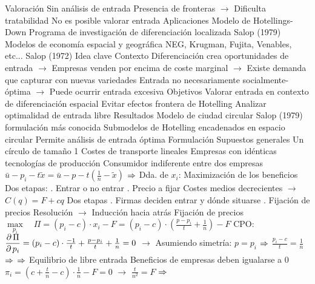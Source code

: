 \documentclass{nuevotema}
\begin{document}
\begin{esquemal}
			\3 Valoración
				\4 Sin análisis de entrada
				\4[] Presencia de fronteras
				\4[] $\to$ Dificulta tratabilidad
				\4 No es posible valorar entrada
			\3 Aplicaciones
				\4 Modelo de Hotellings-Down
				\4 Programa de investigación de diferenciación localizada
				\4[] Salop (1979)
				\4 Modelos de economía espacial y geográfica
				\4[] NEG, Krugman, Fujita, Venables, etc...
		\2 Salop (1972)
			\3 Idea clave
				\4 Contexto
				\4[] Diferenciación crea oportunidades de entrada
				\4[] $\to$ Empresas venden por encima de coste marginal
				\4[] $\to$ Existe demanda que capturar con nuevas variedades
				\4[] Entrada no necesariamente socialmente-óptima
				\4[] $\to$ Puede ocurrir entrada excesiva
				\4 Objetivos
				\4[] Valorar entrada en contexto de diferenciación espacial
				\4[] Evitar efectos frontera de Hotelling
				\4[] Analizar optimalidad de entrada libre
				\4 Resultados
				\4[] Modelo de ciudad circular
				\4[] Salop (1979) formulación más conocida
				\4[] Submodelos de Hotelling encadenados en espacio circular
				\4[] Permite análisis de entrada óptima
			\3 Formulación
				\4 Supuestos generales
				\4[] Un círculo de tamaño 1
				\4[] Costes de transporte lineales
				\4[] Empresas con idénticas tecnologías de producción
				\4 Consumidor indiferente entre dos empresas
				\4[] $\bar{u} - p_i - t \tilde{x} = \bar{u} - p - t(\frac{1}{n} - \tilde{x})$
				\4[] $\Rightarrow$ Dda. de $x_i$: 
				\4 Maximización de los beneficios
				\4[] Dos etapas:
				. Entrar o no entrar
				. Precio a fijar
				\4[] Costes medios decrecientes
				\4[] $\to$ $C(q) = F + cq$
				\4[] Dos etapas
				. Firmas deciden entrar y dónde situarse
				. Fijación de precios
				\4[] Resolución
				\4[] $\to$ Inducción hacia atrás
				\4 Fijación de precios
				\4[] $\underset{p_i}{\max}\quad \Pi=\left(p_i -c \right) \cdot x_i - F = \left( p_i -c \right) \cdot \left( \frac{p - p_i}{t} + \frac{1}{n} \right) - F$
				\4[] CPO: \quad $\dfrac{\partial \, \Pi}{\partial \, p_i} = \left(p_i -c \right) \cdot \frac{-1}{t} + \frac{p - p_i}{t} + \frac{1}{n} = 0$
				\4[] $\to$ Asumiendo simetría: $p = p_i$
				\4[] $\Rightarrow$ $\frac{p_i -c }{t} = \frac{1}{n}$
				\4[] $\Rightarrow$ 
				\4[] $\Rightarrow$ 
				\4 Equilibrio de libre entrada
				\4[] Beneficios de empresas deben igualarse a 0
				\4[] $\pi_i =\left( c+  \frac{t}{n} - c \right) \cdot \frac{1}{n} - F = 0$
				\4[] $\to$ $\frac{t}{n^2} = F$
				\4[] $\Rightarrow$ 

\end{esquemal}
\end{document}
